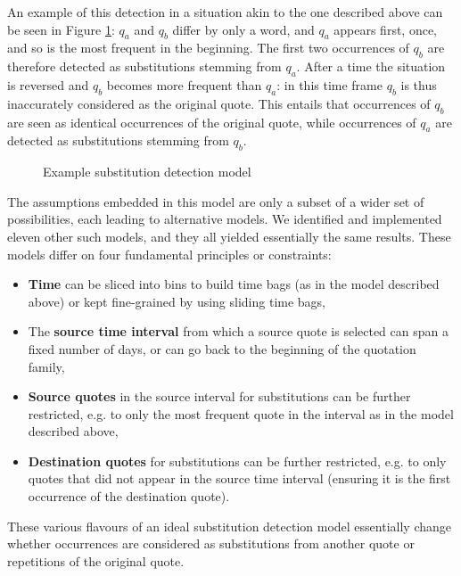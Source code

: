 An example of this detection in a situation akin to the one described above can be seen in Figure \ref{fig:substitution-detection-example}: $q_a$ and $q_b$ differ by only a word, and $q_a$ appears first, once, and so is the most frequent in the beginning.
The first two occurrences of $q_b$ are therefore detected as substitutions stemming from $q_a$.
After a time the situation is reversed and $q_b$ becomes more frequent than $q_a$: in this time frame $q_b$ is thus inaccurately considered as the original quote.
This entails that occurrences of $q_b$ are seen as identical occurrences of the original quote, while occurrences of $q_a$ are detected as substitutions stemming from $q_b$.

\begin{figure}[h]
    \centering
    \def\svgwidth{\linewidth}
    \small
    
    \caption{Example substitution detection model}
    \label{fig:substitution-detection-example}
\end{figure}

The assumptions embedded in this model are only a subset of a wider set of possibilities, each leading to alternative models.
We identified and implemented eleven other such models, and they all yielded essentially the same results.
These models differ on four fundamental principles or constraints:

\begin{itemize}
    \item \textbf{Time} can be sliced into bins to build time bags (as in the model described above) or kept fine-grained by using sliding time bags,
    \item The \textbf{source time interval} from which a source quote is selected can span a fixed number of days, or can go back to the beginning of the quotation family,
    \item \textbf{Source quotes} in the source interval for substitutions can be further restricted, e.g. to only the most frequent quote in the interval as in the model described above,
    \item \textbf{Destination quotes} for substitutions can be further restricted, e.g. to only quotes that did not appear in the source time interval (ensuring it is the first occurrence of the destination quote).
\end{itemize}

These various flavours of an ideal substitution detection model essentially change whether occurrences are considered as substitutions from another quote or repetitions of the original quote.

